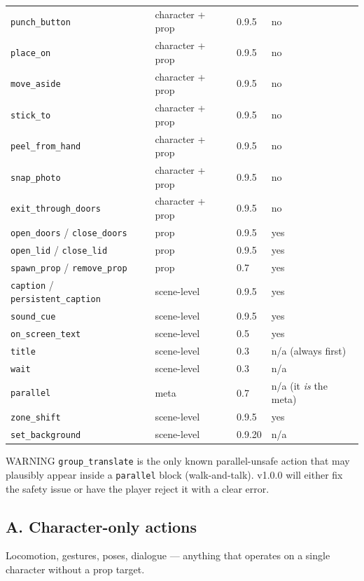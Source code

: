 \documentclass[
  12pt,
  letterpaper,
]{book}
\begin{document}
\begin{longtable}[]{@{}llll@{}}
\texttt{punch\_button} & character + prop & 0.9.5 & no \\
\texttt{place\_on} & character + prop & 0.9.5 & no \\
\texttt{move\_aside} & character + prop & 0.9.5 & no \\
\texttt{stick\_to} & character + prop & 0.9.5 & no \\
\texttt{peel\_from\_hand} & character + prop & 0.9.5 & no \\
\texttt{snap\_photo} & character + prop & 0.9.5 & no \\
\texttt{exit\_through\_doors} & character + prop & 0.9.5 & no \\
\texttt{open\_doors} / \texttt{close\_doors} & prop & 0.9.5 & yes \\
\texttt{open\_lid} / \texttt{close\_lid} & prop & 0.9.5 & yes \\
\texttt{spawn\_prop} / \texttt{remove\_prop} & prop & 0.7 & yes \\
\texttt{caption} / \texttt{persistent\_caption} & scene-level & 0.9.5 &
yes \\
\texttt{sound\_cue} & scene-level & 0.9.5 & yes \\
\texttt{on\_screen\_text} & scene-level & 0.5 & yes \\
\texttt{title} & scene-level & 0.3 & n/a (always first) \\
\texttt{wait} & scene-level & 0.3 & n/a \\
\texttt{parallel} & meta & 0.7 & n/a (it \emph{is} the meta) \\
\texttt{zone\_shift} & scene-level & 0.9.5 & yes \\
\texttt{set\_background} & scene-level & 0.9.20 & n/a \\
\end{longtable}

WARNING \texttt{group\_translate} is the only known parallel-unsafe
action that may plausibly appear inside a \texttt{parallel} block
(walk-and-talk). v1.0.0 will either fix the safety issue or have the
player reject it with a clear error.

\subsection{A. Character-only actions}\label{a.-character-only-actions}

Locomotion, gestures, poses, dialogue --- anything that operates on a
single character without a prop target.
\end{document}
